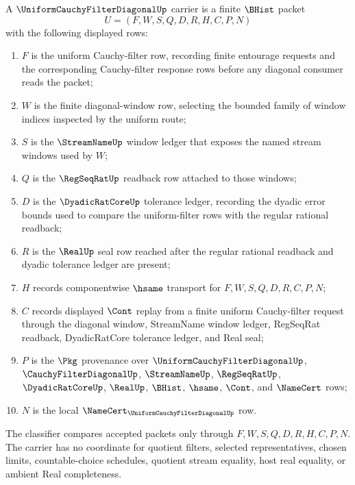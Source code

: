 \begin{definition}
\label{def:uniform-cauchy-filter-diagonal-carrier}
A $\UniformCauchyFilterDiagonalUp$ carrier is a finite $\BHist$ packet
$$
U=(F,W,S,Q,D,R,H,C,P,N)
$$
with the following displayed rows:
\begin{enumerate}
\item $F$ is the uniform Cauchy-filter row, recording finite entourage requests and the corresponding Cauchy-filter response rows before any diagonal consumer reads the packet;
\item $W$ is the finite diagonal-window row, selecting the bounded family of window indices inspected by the uniform route;
\item $S$ is the $\StreamNameUp$ window ledger that exposes the named stream windows used by $W$;
\item $Q$ is the $\RegSeqRatUp$ readback row attached to those windows;
\item $D$ is the $\DyadicRatCoreUp$ tolerance ledger, recording the dyadic error bounds used to compare the uniform-filter rows with the regular rational readback;
\item $R$ is the $\RealUp$ seal row reached after the regular rational readback and dyadic tolerance ledger are present;
\item $H$ records componentwise $\hsame$ transport for $F,W,S,Q,D,R,C,P,N$;
\item $C$ records displayed $\Cont$ replay from a finite uniform Cauchy-filter request through the diagonal window, StreamName window ledger, RegSeqRat readback, DyadicRatCore tolerance ledger, and Real seal;
\item $P$ is the $\Pkg$ provenance over $\UniformCauchyFilterDiagonalUp$, $\CauchyFilterDiagonalUp$, $\StreamNameUp$, $\RegSeqRatUp$, $\DyadicRatCoreUp$, $\RealUp$, $\BHist$, $\hsame$, $\Cont$, and $\NameCert$ rows;
\item $N$ is the local $\NameCert_{\UniformCauchyFilterDiagonalUp}$ row.
\end{enumerate}
The classifier compares accepted packets only through $F,W,S,Q,D,R,H,C,P,N$. The carrier has no coordinate for quotient filters, selected representatives, chosen limits, countable-choice schedules, quotient stream equality, host real equality, or ambient Real completeness.
\end{definition}

